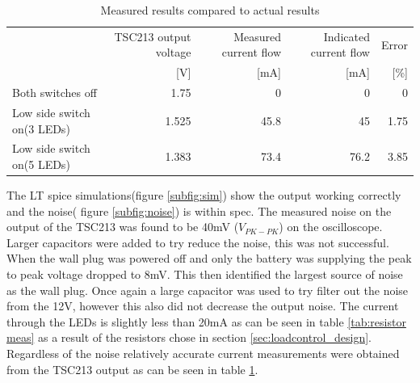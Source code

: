 \begin{table}[!htb]
        \centering
        \footnotesize
        \caption{Measured results compared to actual results}
         \begin{tabular}{lrrrr}
          \toprule
             & TSC213 output voltage&Measured current flow & Indicated current flow& Error \\
             &   [V]&[mA]  &[mA]&[\%]\\
          \midrule
         Both switches off      & 1.75 &0 &0 &0 \\
         Low side switch on(3 LEDs)     & 1.525 & 45.8&45 &1.75 \\
         Low side switch on(5 LEDs)    & 1.383 & 73.4&76.2 &3.85 \\
          
          \bottomrule
        \end{tabular}
     \label{tab:compare}
\end{table}
The LT spice simulations(figure \ref{subfig:sim}) show the output working correctly and the noise( figure \ref{subfig:noise}) is within spec. The measured noise on the output of the TSC213 was found to be 40mV ($V_{PK-PK}$) on the oscilloscope. Larger capacitors were added to try reduce the noise, this was not successful. When the wall plug was powered off and only the battery was supplying the peak to peak voltage dropped to 8mV. This then identified the largest source of noise as the wall plug. Once again a large capacitor was used to try filter out the noise from the 12V, however this also did not decrease the output noise. The current through the LEDs is slightly less than 20mA as can be seen in table \ref{tab:resistor meas} as a result of the resistors chose in section \ref{sec:loadcontrol_design}. Regardless of the noise relatively accurate current measurements were obtained from the TSC213 output as can be seen in table \ref{tab:compare}.

\newpage
